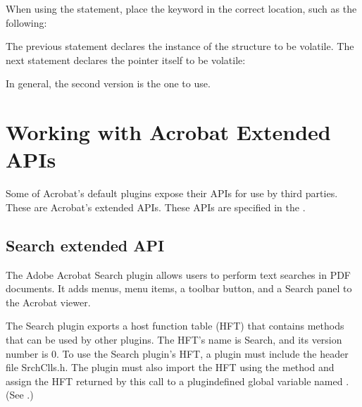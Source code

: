 \documentclass[letterpaper,12pt,english,openany,oneside]{sphinxmanual}
\begin{document}
When using the  statement, place the keyword in the correct location, such as the following:

\begin{sphinxVerbatim}[commandchars=\\\{\}]
    
\end{sphinxVerbatim}

The previous statement declares the instance of the structure to be volatile. The next statement declares the pointer itself to be volatile:

\begin{sphinxVerbatim}[commandchars=\\\{\}]
    
\end{sphinxVerbatim}

In general, the second version is the one to use.


\chapter{Working with Acrobat Extended APIs}
\label{\detokenize{Plugins_ExtendedAPI:working-with-acrobat-extended-apis}}\label{\detokenize{Plugins_ExtendedAPI::doc}}
Some of Acrobat’s default plugins expose their APIs for use by third parties. These are Acrobat’s extended APIs. These APIs are specified in the .


\section{Search extended API}
\label{\detokenize{Plugins_ExtendedAPI:search-extended-api}}
The Adobe Acrobat Search plugin allows users to perform text searches in PDF documents. It adds menus, menu items, a toolbar button, and a Search panel to the Acrobat viewer.

The Search plugin exports a host function table (HFT) that contains methods that can be used by other plugins. The HFT’s name is Search, and its version number is 0. To use the Search plugin’s HFT, a plugin must include the header file SrchClls.h. The plugin must also import the HFT using the  method and assign the HFT returned by this call to a plugin\sphinxhyphen{}defined global variable named . (See .)
\end{document}
